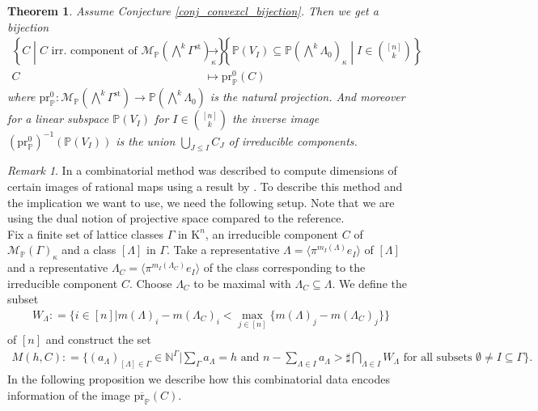 \documentclass[11pt,a4paper]{amsart}
\newtheorem{thm}[prop]{Theorem}
\theoremstyle{definition}
\theoremstyle{remark}
\newtheorem{rem}[prop]{Remark}
\newcommand{\N}{\mathbb{N}}
\newcommand{\Projsp}{\mathbb{P}}
\newcommand{\res}{\kappa}
\newcommand{\unif}{\pi}
\newcommand{\quot}{\mathrm{K}}
\newcommand{\defeq}{\mathrel{\mathop:}=}
\newcommand{\M}[1]{\mathcal{M}_{\Projsp}\left(#1\right)}
\newcommand{\projbar}{\mathrm{\overline{\pr_{\Projsp}}}}
\newcommand{\project}[1]{\mathrm{\pr_{\Projsp}^{#1}}}
\newcommand{\pr}{\mathrm{pr}}
\begin{document}
\begin{thm}
   \label{thm_components_linear_subsp}
	Assume Conjecture \ref{conj_convexcl_bijection}. Then we get a bijection
	\begin{align*}
		\left\{C\middle\vert C \text{ irr. component of } \M{\bigwedge^k\Gamma^{\mathrm{st}}}_{\res} \right\}&\longrightarrow \left\{\Projsp (V_I)\subseteq \Projsp(\bigwedge^k \Lambda_0)_{\res}\middle\vert I \in \binom{[n]}{k} \right\}\\
		C & \longmapsto \project{0} (C)
	\end{align*}
	where $\project{0}\colon \M{\bigwedge^k\Gamma^{\mathrm{st}}}\rightarrow \Projsp(\bigwedge^k \Lambda_0)$ is the natural projection. 
	And moreover for a linear subspace $\Projsp(V_I)$ for $I\in \binom{[n]}{k}$ the inverse image $(\project{0})^{-1}(\Projsp(V_I) )$ is the union $\bigcup_{J\leq I} C_J$ of irreducible components. 
\end{thm}


\begin{rem}
	In \cite{AL17} a combinatorial method was described to compute dimensions of certain images of rational maps using a result by \cite{Li18}. To describe this method and the implication we want to use, we need the following setup. Note that we are using the dual notion of projective space compared to the reference.\\
	Fix a finite set of lattice classes $\Gamma$ in $\quot^n$, an irreducible component $C$ of $\M{\Gamma}_{\res}$ and a class $[\Lambda]$ in $\Gamma$. Take a representative $\Lambda=\langle \unif^{m_I (\Lambda )} e_I \rangle$ of $[\Lambda]$ and a representative $\Lambda_C= \langle \unif^{m_I(\Lambda_C )}e_I\rangle$ of the class corresponding to the irreducible component $C$. Choose $\Lambda_C$ to be maximal with $\Lambda_C \subseteq\Lambda$. We define the subset 
	\begin{align*}
		W_{\Lambda}\defeq\{i\in[n]\vert m(\Lambda)_i-m(\Lambda_C )_i< \max\limits_{j\in [n]}\{m(\Lambda)_j-m(\Lambda_C )_j\} \}
	\end{align*}  of $[n]$ and construct the set 
	\begin{align*}
		M(h,C)\defeq\{(a_\Lambda)_{[\Lambda]\in \Gamma}\in\N^{\Gamma}\vert \sum_{\Gamma}a_\Lambda =h\text{ and } n-\sum_{\Lambda\in  I}a_\Lambda > \sharp\bigcap_{\Lambda\in I}W_{\Lambda}\text{ for all subsets } \emptyset\neq I \subseteq\Gamma \}.
	\end{align*} 
	In the following proposition we describe how this combinatorial data encodes information of the image $\projbar (C)$.
\end{rem}
\end{document}
